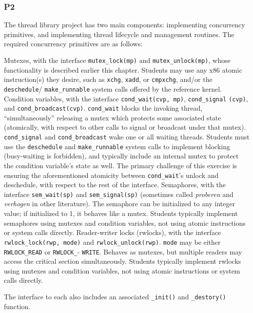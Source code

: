 \subsubsection{P2}
The thread library project \cite{thrlib} has two main components: implementing concurrency primitives, and implementing thread lifecycle and management routines.
The required concurrency primitives are as follows:
\begin{itemize}
	\llitem Mutexes, with the interface {\tt mutex\_lock(mp)} and {\tt mutex\_unlock(mp)}, whose functionality is described earlier this chapter. Students may use any x86 atomic instruction(s) they desire, such as {\tt xchg}, {\tt xadd}, or {\tt cmpxchg}, and/or the {\tt deschedule}/ {\tt make\_runnable} system calls offered by the reference kernel.
	\llitem Condition variables, with the interface {\tt cond\_wait(cvp, mp)}, {\tt cond\_signal} {\tt (cvp)}, and {\tt cond\_broadcast(cvp)}. {\tt cond\_wait} blocks the invoking thread, ``simultaneously'' releasing a mutex which protects some associated state (atomically, with respect to other calls to signal or broadcast under that mutex).
		{\tt cond\_signal} and {\tt cond\_broadcast} wake one or all waiting threads.
		Students must use the {\tt deschedule} and {\tt make\_runnable} system calls to implement blocking (busy-waiting is forbidden), and typically include an internal mutex to protect the condition variable's state as well.
		The primary challenge of this exercise is ensuring the aforementioned atomicity between {\tt cond\_wait}'s unlock and deschedule, with respect to the rest of the interface.
	\llitem Semaphores, with the interface {\tt sem\_wait(sp)} and {\tt sem\_signal(sp)} (sometimes called {\em proberen} and {\em verhogen} in other literature). The semaphore can be initialized to any integer value; if initialized to 1, it behaves like a mutex.
		Students typically implement semaphores using mutexes and condition variables, not using atomic instructions or system calls directly.
	\llitem Reader-writer locks (rwlocks), with the interface {\tt rwlock\_lock(rwp, mode)} and {\tt rwlock\_unlock(rwp)}. {\tt mode} may be either {\tt RWLOCK\_READ} or {\tt RWLOCK\_}- {\tt WRITE}.
		Behaves as mutexes, but multiple readers may access the critical section simultaneously.
		Students typically implement rwlocks using mutexes and condition variables, not using atomic instructions or system calls directly.
\end{itemize}
The interface to each also includes an associated {\tt \_init()} and {\tt \_destory()} function.

